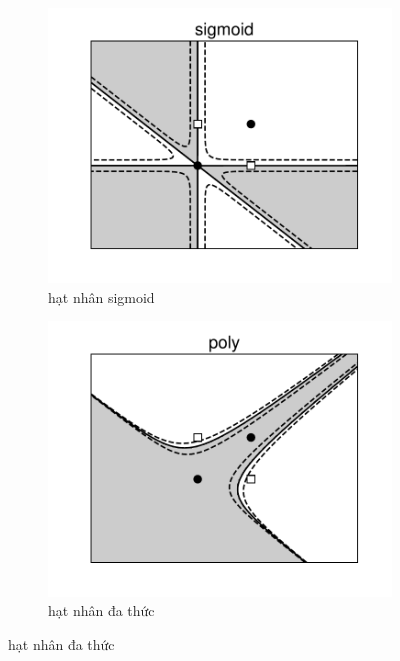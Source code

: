 \begin{figure}[t]
\begin{subfigure}{0.325\textwidth}
\includegraphics[width=\linewidth]{Chapters/09_SupportVectorMachines/21_kernelsvm/plt/sigmoid1.pdf}
\caption{hạt nhân sigmoid}
\end{subfigure}
\begin{subfigure}{0.325\textwidth}
\includegraphics[width=\linewidth]{Chapters/09_SupportVectorMachines/21_kernelsvm/plt/poly1.pdf}
\caption{hạt nhân đa thức}

\end{subfigure}
\end{figure}
